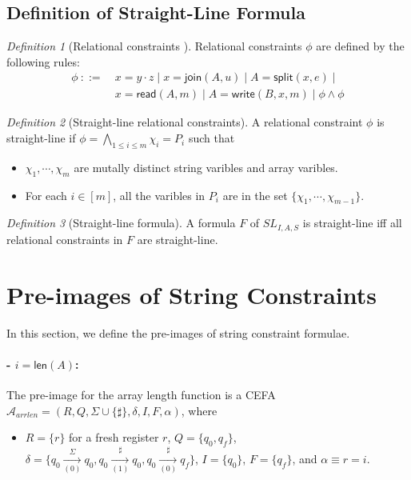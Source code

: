 \documentclass[12pt]{article}
\newcommand*{\aut}{\mathcal{A}}
\newcommand{\arrconcat}{\sharp}
\newcommand{\mysplit}{\mathsf{split}}
\newcommand{\myjoin}{\mathsf{join}}
\newcommand{\mylen}{\mathsf{len}}
\newcommand{\myread}{\mathsf{read}}
\newcommand{\mywrite}{\mathsf{write}}
\newcommand{\myset}[1]{\{#1\}}
\newcommand{\arraylogic}{SL_{I,A,S}}
\theoremstyle{remark}
\newtheorem{definition}{Definition}[section]
\begin{document}
\subsection{Definition of Straight-Line Formula }
\begin{definition}[Relational constraints ]
    Relational constraints $\phi$ are defined by the following rules:
    \begin{align*}
        \phi \ ::= \  & x=y\cdot z \mid x=\myjoin(A,u) \mid A = \mysplit(x,e) \mid         \\
                      & x=\myread(A, m) \mid A = \mywrite(B, x ,m) \mid \phi \wedge \phi 
    \end{align*}
\end{definition}
\begin{definition}[Straight-line relational constraints]
    A relational constraint $\phi$ is straight-line if $\phi = \bigwedge\limits_{1\leq i \leq m} \chi_i = P_i$ such that
    \begin{itemize}
        \item $\chi_1,\cdots,\chi_m $ are mutally distinct string varibles and array varibles.
        \item For each $i\in [m] $, all the varibles in $P_i$ are in the set $\{\chi_1,\cdots,\chi_{m-1} \}$.
    \end{itemize}
\end{definition}
\begin{definition}[Straight-line formula]
    A formula $F$ of $\arraylogic$ is straight-line iff all relational constraints in $F$ are straight-line.
\end{definition}

\section{Pre-images of String Constraints}\label{sec:pre_image}
In this section, we define the pre-images of string constraint formulae.
\paragraph{- $i = \mylen(A)$:} The pre-image for the array length function is a CEFA $\aut_{arrlen}=(R, Q, \Sigma\cup\{\arrconcat\}, \delta, I, F, \alpha)$, where
\begin{itemize}
    \item $R = \{r\}$ for a fresh register $r$, $Q = \{q_0, q_f\}$, $\delta = \myset{q_0\xrightarrow[(0)]{\Sigma}q_0, q_0\xrightarrow[(1)]{\sharp}q_0, q_0\xrightarrow[(0)]{\arrconcat}q_f }$, $I = \myset{q_0}$, $F = \myset{q_f}$, and $\alpha \equiv r = i$.
\end{itemize}
\end{document}
